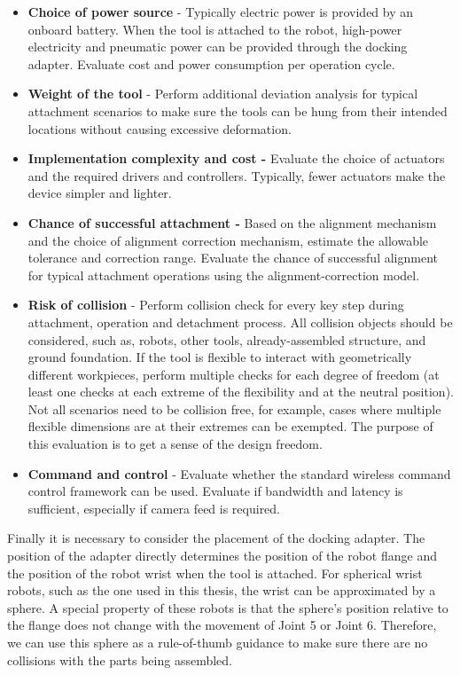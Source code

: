 \begin{itemize}
	\item \textbf{Choice of power source} - Typically electric power is provided by an onboard battery. When the tool is attached to the robot, high-power electricity and pneumatic power can be provided through the docking adapter. Evaluate cost and power consumption per operation cycle.

	\item \textbf{Weight of the tool }- Perform additional deviation analysis for typical attachment scenarios to make sure the tools can be hung from their intended locations without causing excessive deformation.

	\item \textbf{Implementation complexity and cost - }Evaluate the choice of actuators and the required drivers and controllers. Typically, fewer actuators make the device simpler and lighter.

	\item \textbf{Chance of successful attachment - }Based on the alignment mechanism and the choice of alignment correction mechanism, estimate the allowable tolerance and correction range. Evaluate the chance of successful alignment for typical attachment operations using the alignment-correction model. 

	\item \textbf{Risk of collision} - Perform collision check for every key step during attachment, operation and detachment process. All collision objects should be considered, such as, robots, other tools, already-assembled structure, and ground foundation. If the tool is flexible to interact with geometrically different workpieces, perform multiple checks for each degree of freedom (at least one checks at each extreme of the flexibility and at the neutral position). Not all scenarios need to be collision free, for example, cases where multiple flexible dimensions are at their extremes can be exempted. The purpose of this evaluation is to get a sense of the design freedom. 

	\item \textbf{Command and control }- Evaluate whether the standard wireless command control framework can be used. Evaluate if bandwidth and latency is sufficient, especially if camera feed is required.

\end{itemize}
Finally it is necessary to consider the placement of the docking adapter. The position of the adapter directly determines the position of the robot flange and the position of the robot wrist when the tool is attached. For spherical wrist robots, such as the one used in this thesis, the wrist can be approximated by a sphere. A special property of these robots is that the sphere’s position relative to the flange does not change with the movement of Joint 5 or Joint 6. Therefore, we can use this sphere as a rule-of-thumb guidance to make sure there are no collisions with the parts being assembled.

